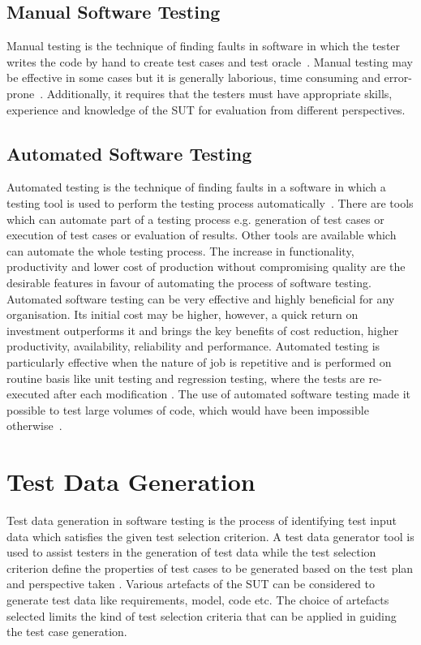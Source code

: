 \subsection{Manual Software Testing}
Manual testing is the technique of finding faults in software in which the tester writes the code by hand to create test cases and test oracle~\cite{Ciupa2008}. Manual testing may be effective in some cases but it is generally laborious, time consuming and error-prone~\cite{tretmans1999}. Additionally, it requires that the testers must have appropriate skills, experience and knowledge of the SUT for evaluation from different perspectives.
 
\subsection{Automated Software Testing}
Automated testing is the technique of finding faults in a software in which a testing tool is used to perform the testing process automatically~\cite{Leitner2007}. There are tools which can automate part of a testing process e.g. generation of test cases or execution of test cases or evaluation of results. Other tools are available which can automate the whole testing process. The increase in functionality, productivity and lower cost of production without compromising quality are the desirable features in favour of automating the process of software testing. Automated software testing can be very effective and highly beneficial for any organisation. Its initial cost may be higher, however, a quick return on investment outperforms it and brings the key benefits of cost reduction, higher productivity, availability, reliability and performance. Automated testing is particularly effective when the nature of job is repetitive and is performed on routine basis like unit testing and regression testing, where the tests are re-executed after each modification \cite{huang2003automated}. The use of automated software testing made it possible to test large volumes of code, which would have been impossible otherwise~\cite{ramamoorthy1975testing}.

\section{Test Data Generation}
Test data generation in software testing is the process of identifying test input data which satisfies the given test selection criterion. A test data generator tool is used to assist testers in the generation of test data while the test selection criterion define the properties of test cases to be generated based on the test plan and perspective taken \cite{korel1990}. Various artefacts of the SUT can be considered to generate test data like requirements, model, code etc. The choice of artefacts selected limits the kind of test selection criteria that can be applied in guiding the test case generation. 

